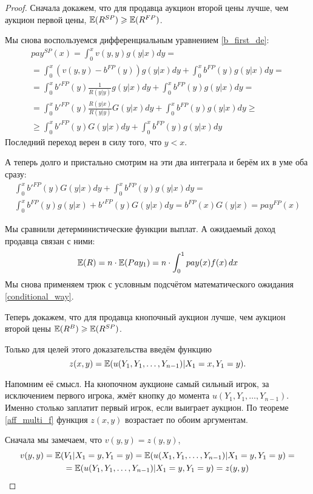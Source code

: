 \begin{proof}
Сначала докажем, что для продавца аукцион второй цены лучше, чем аукцион первой цены, $\operatorname{\mathbb{E}}(R^{SP})\geqslant \operatorname{\mathbb{E}}(R^{FP})$.


Мы снова воспользуемся дифференциальным уравнением \ref{b_first_de}:
\begin{multline}
pay^{SP}(x)=\int_{0}^{x}v(y,y)g(y|x)dy=\\
=\int_{0}^{x}(v(y,y)-b^{FP}(y))g(y|x)dy+\int_{0}^{x}b^{FP}(y)g(y|x)dy=\\
=\int_{0}^{x}b'^{FP}(y)\frac{1}{R(y|y)}g(y|x)dy+\int_{0}^{x}b^{FP}(y)g(y|x)dy=\\
=\int_{0}^{x}b'^{FP}(y)\frac{R(y|x)}{R(y|y)}G(y|x)dy+\int_{0}^{x}b^{FP}(y)g(y|x)dy\geq\\
\geq \int_{0}^{x}b'^{FP}(y)G(y|x)dy+\int_{0}^{x}b^{FP}(y)g(y|x)dy
\end{multline}
Последний переход верен в силу того, что $ y<x $.

А теперь долго и пристально смотрим на эти два интеграла и берём их в уме оба сразу:
\begin{multline}
\int_{0}^{x}b'^{FP}(y)G(y|x)dy+\int_{0}^{x}b^{FP}(y)g(y|x)dy=\\
\int_{0}^{x}b^{FP}(y)g(y|x)+b'^{FP}(y)G(y|x) dy=b^{FP}(x)G(y|x)=pay^{FP}(x)
\end{multline}

Мы сравнили детерминистические функции выплат. А ожидаемый доход продавца связан с ними:
\begin{equation}
\operatorname{\mathbb{E}}(R)=n\cdot \operatorname{\mathbb{E}}(Pay_{1})=n\cdot \int_{0}^{1}pay(x)f(x) \, dx
\end{equation}
Мы снова применяем трюк с условным подсчётом математического ожидания \ref{conditional_way}.

Теперь докажем, что для продавца кнопочный аукцион лучше, чем аукцион второй цены $ \operatorname{\mathbb{E}}(R^{B})\geqslant \operatorname{\mathbb{E}}(R^{SP}) $.

Только для целей этого доказательства введём функцию
\[
z(x,y)=\operatorname{\mathbb{E}}(u(Y_{1},Y_{1},\ldots,Y_{n-1})|X_{1}=x,Y_{1}=y).
\]

Напомним её смысл. На кнопочном аукционе самый сильный игрок, за исключением первого игрока, жмёт кнопку до момента $ u(Y_{1},Y_{1},\ldots,Y_{n-1}) $. Именно столько заплатит первый игрок, если выиграет аукцион. По теореме \ref{aff_multi_f} функция $ z(x,y) $ возрастает по обоим аргументам.

Сначала мы замечаем, что $ v(y,y)=z(y,y) $,
\begin{multline}
v(y,y)=\operatorname{\mathbb{E}}(V_{1}|X_{1}=y, Y_{1}=y)=\operatorname{\mathbb{E}}(u(X_{1},Y_{1},\ldots,Y_{n-1})|X_{1}=y, Y_{1}=y)=\\
=\operatorname{\mathbb{E}}(u(Y_{1},Y_{1},\ldots,Y_{n-1})|X_{1}=y, Y_{1}=y)=z(y,y)
\end{multline}


\end{proof}
